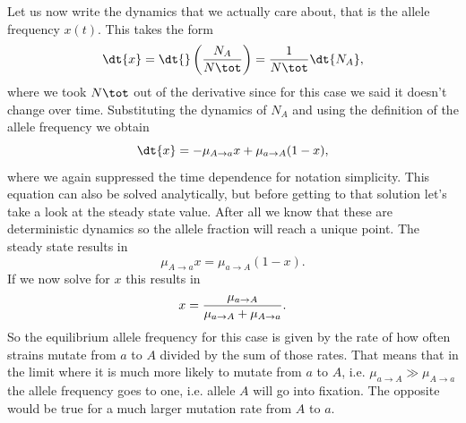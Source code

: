 Let us now write the dynamics that we actually care about, that is the allele
frequency $x(t)$. This takes the form
\begin{equation}
  \dt{x} = \dt{}\left( {N_A \over N\tot} \right) = {1 \over N\tot} \dt{N_A},
\end{equation}
where we took $N\tot$ out of the derivative since for this case we said it
doesn't change over time. Substituting the dynamics of $N_A$ and using the
definition of the allele frequency we obtain
\begin{equation}
  \dt{x} = - \mu_{A\rightarrow a} x + \mu_{a\rightarrow A} (1 - x),
  \label{eq_mutation_ode}
\end{equation}
where we again suppressed the time dependence for notation simplicity. This
equation can also be solved analytically, but before getting to that solution
let's take a look at the steady state value. After all we know that these are
deterministic dynamics so the allele fraction will reach a unique point. The
steady state results in
\begin{equation}
  \mu_{A\rightarrow a} x = \mu_{a\rightarrow A} (1 - x).
\end{equation}
If we now solve for $x$ this results in
\begin{equation}
  x = {\mu_{a\rightarrow A} \over \mu_{a\rightarrow A} + \mu_{A\rightarrow a}}.
\end{equation}
So the equilibrium allele frequency for this case is given by the rate of how
often strains mutate from $a$ to $A$ divided by the sum of those rates. That
means that in the limit where it is much more likely to mutate from $a$ to $A$,
i.e. $\mu_{a\rightarrow A} \gg \mu_{A\rightarrow a}$ the allele frequency goes
to one, i.e. allele $A$ will go into fixation. The opposite would be true for a
much larger mutation rate from $A$ to $a$.

